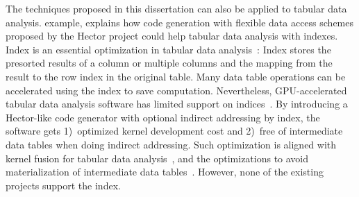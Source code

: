 The techniques proposed in this dissertation can also be applied to tabular data analysis.  example,  explains how code generation with flexible data access schemes proposed by the Hector project could help tabular data analysis with indexes.
Index is an essential optimization in tabular data analysis~\cite{optimizdbaDatabaseOptimizationTechniques2018,oracleMySQLMySQL842024}: Index stores the presorted results of a column or multiple columns and the mapping from the result to the row index in the original table. Many data table operations can be accelerated using the index to save computation.
Nevertheless, GPU-accelerated tabular data analysis software has limited support on indices~\cite{IndexTable2023,sqreamSQreamsUniqueArchitecture2024}.
By introducing a Hector-like code generator with optional indirect addressing by index, the software gets 1)~optimized kernel development cost  and 2)~free of intermediate data tables when doing indirect addressing.
Such optimization is aligned with kernel fusion for tabular data analysis~\cite{caoGPUDatabaseSystems2023,palkarEvaluatingEndendOptimization2018}, and the optimizations to avoid materialization of intermediate data tables~\cite{nakandalaTensorCompilerUnified2020}. However, none of the existing projects support the index.





